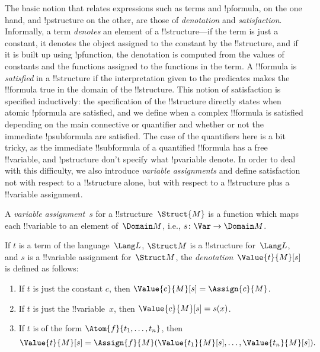 \documentclass[../../include/open-logic-section]{subfiles}
\begin{document}

\begin{explain}
The basic notion that relates expressions such as terms and
!p{formula}, on the one hand, and !p{structure} on the other, are
those of \emph{denotation} and \emph{satisfaction}.  Informally, a
term \emph{denotes} an element of a !!{structure}---if the term is
just a constant, it denotes the object assigned to the constant by the
!!{structure}, and if it is built up using !p{function}, the
denotation is computed from the values of constants and the functions
assigned to the functions in the term.  A !!{formula} is
\emph{satisfied} in a !!{structure} if the interpretation given to the
predicates makes the !!{formula} true in the domain of the
!!{structure}. This notion of satisfaction is specified inductively:
the specification of the !!{structure} directly states when atomic
!p{formula} are satisfied, and we define when a complex !!{formula} is
satisfied depending on the main connective or quantifier and whether
or not the immediate !p{subformula} are satisfied. The case of the
quantifiers here is a bit tricky, as the immediate !!{subformula} of a
quantified !!{formula} has a free !!{variable}, and !p{structure}
don't specify what !p{variable} denote.  In order to deal with this
difficulty, we also introduce \emph{variable assignments} and define
satisfaction not with respect to a !!{structure} alone, but with
respect to a !!{structure} plus a !!{variable} assignment.
\end{explain}

\begin{defn}
A \emph{variable assignment}~$s$ for a !!{structure}~$\Struct{M}$ is a
function which maps each !!{variable} to an element of~$\Domain M$,
i.e., $s\colon \Var \to \Domain M$.
\end{defn}

\begin{defn}
If $t$ is a term of the language~$\Lang L$, $\Struct M$ is a
!!{structure} for~$\Lang L$, and $s$ is a !!{variable} assignment
for~$\Struct M$, the \emph{denotation}~$\Value{t}{M}[s]$ is defined as
follows:
\begin{enumerate}
\item If $t$ is just the constant $c$, then $\Value{c}{M}[s] = \Assign{c}{M}$.
\item If $t$ is just the !!{variable}~$x$, then $\Value{c}{M}[s] = s(x)$.
\item If $t$ is of the form $\Atom{f}{t_1, \ldots, t_n}$, then
\[
\Value{t}{M}[s] = \Assign{f}{M}(\Value{t_1}{M}[s], \ldots,
\Value{t_n}{M}[s]).
\]
\end{enumerate}
\end{defn}
\end{document}
